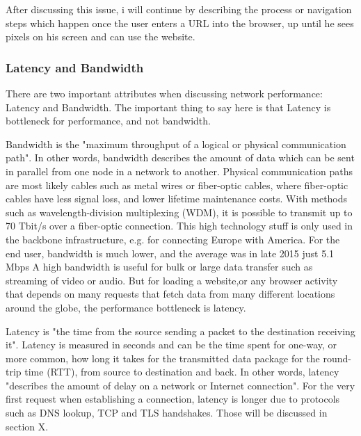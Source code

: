 After discussing this issue, i will continue by describing the process or navigation steps which happen once the user enters a URL into the browser, up until he sees pixels on his screen and can use the website.




\subsubsection{Latency and Bandwidth}

There are two important attributes when discussing network performance: Latency and Bandwidth.
The important thing to say here is that Latency is bottleneck for performance, and not bandwidth.



Bandwidth is the "maximum throughput of a logical or physical communication path". %
In other words, bandwidth describes the amount of data which can be sent in parallel from one node in a network to another. 
Physical communication paths are most likely cables such as metal wires or fiber-optic cables, where fiber-optic cables have less signal loss, and lower lifetime maintenance costs.
With methods such as wavelength-division multiplexing (WDM), it is possible to transmit up to 70 Tbit/s over a fiber-optic connection.  %
This high technology stuff is only used in the backbone infrastructure, e.g. for connecting Europe with America.
For the end user, bandwidth is much lower, and the average was in late 2015 just 5.1 Mbps %
A high bandwidth is useful for bulk or large data transfer such as streaming of video or audio.
But for loading a website,or any browser activity that depends on many requests that fetch data from many different locations around the globe, the performance bottleneck is latency. %



Latency is "the time from the source sending a packet to the destination receiving it".  %
Latency is measured in seconds and can be the time spent for one-way, or more common, how long it takes for the transmitted data package for the round-trip time (RTT), from source to destination and back.
In other words, latency "describes the amount of delay on a network or Internet connection". %
For the very first request when establishing a connection, latency is longer due to protocols such as DNS lookup, TCP and TLS handshakes.
Those will be discussed in section X. %


